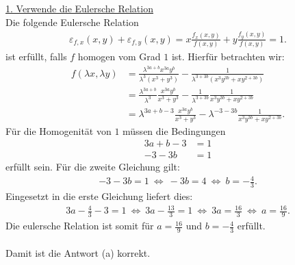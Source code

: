 \underline{1. Verwende die Eulersche Relation}\\
Die folgende Eulersche Relation 
\begin{align*}
	\varepsilon_{f,x}(x,y) + \varepsilon_{f,y}(x,y) 
	= x \frac{f_x(x,y)}{f(x,y)} + y \frac{f_y(x,y)}{f(x,y)}
	= 1.
\end{align*}
ist erfüllt, falls $f$ homogen vom Grad $1$ ist. Hierfür betrachten wir:
\begin{align*}
	f(\lambda x , \lambda y)
	&=
	\frac{\lambda^{3a + b} x^{3a} y^b}{\lambda^3 (x^3 + y^3)}
	-
	\frac{1}{
	\lambda^{3 + 3b}
	(
	x^3 y^{3b} + x y^{2+ 3b}
	)
	}\\
	&= 
	\frac{\lambda^{3a + b}}{\lambda^3}
	\frac{x^{3a} y^b}{x^3 + y^3}
	-
	\frac{1}{\lambda^{3 + 3b}}
	\frac{1}{
		x^3 y^{3b} + x y^{2+ 3b}
	}\\
	&= 
	\lambda^{3a + b -3 }
	\frac{x^{3a} y^b}{x^3 + y^3}
	-
	\lambda^{-3 - 3b}
	\frac{1}{
		x^3 y^{3b} + x y^{2+ 3b}
	}.
\end{align*}
Für die Homogenität von $1$ müssen die Bedingungen
\begin{align*}
	3a + b - 3 &= 1\\
	-3 - 3b &= 1
\end{align*}
erfüllt sein. Für die zweite Gleichung gilt:
\begin{align*}
	-3 -3 b = 1  
	\ \Leftrightarrow \
	-3 b = 4 
	\ \Leftrightarrow \
	b = - \frac{4}{3}.
\end{align*}
Eingesetzt in die erste Gleichung liefert dies:
\begin{align*}
	3a - \frac{4}{3}  -3 = 1
	\ \Leftrightarrow \
	3a - \frac{13}{3}  = 1 
	\ \Leftrightarrow \
	3a = \frac{16}{3}
	\ \Leftrightarrow \
	 a  = \frac{16}{9}.
\end{align*}
Die eulersche Relation ist somit für $a  = \frac{16}{9}$ und $b = - \frac{4}{3}$ erfüllt.\\
\\
Damit ist die Antwort (a) korrekt.